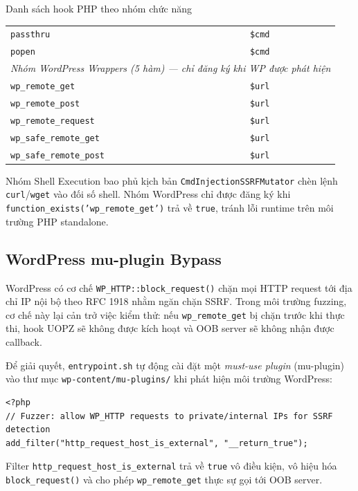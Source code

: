 \begin{table}[h]{Danh sách hook PHP theo nhóm chức năng}
\begin{tabular}{|l|l|p{4.2cm}|}
\texttt{passthru}             & \texttt{\$cmd}       & \\
\texttt{popen}                & \texttt{\$cmd}       & \\
\hline
\multicolumn{3}{|l|}{\textit{Nhóm WordPress Wrappers (5 hàm) — chỉ đăng ký khi WP được phát hiện}} \\
\hline
\texttt{wp\_remote\_get}       & \texttt{\$url}      & \\
\texttt{wp\_remote\_post}      & \texttt{\$url}      & \\
\texttt{wp\_remote\_request}   & \texttt{\$url}      & \\
\texttt{wp\_safe\_remote\_get} & \texttt{\$url}      & \\
\texttt{wp\_safe\_remote\_post}& \texttt{\$url}      & \\
\hline
\end{tabular}
\end{table}

Nhóm Shell Execution bao phủ kịch bản \texttt{CmdInjectionSSRFMutator}
chèn lệnh \texttt{curl}/\texttt{wget} vào đối số shell. Nhóm WordPress
chỉ được đăng ký khi \texttt{function\_exists('wp\_remote\_get')} trả về
\texttt{true}, tránh lỗi runtime trên môi trường PHP standalone.

\subsection{WordPress mu-plugin Bypass}

WordPress có cơ chế \texttt{WP\_HTTP::block\_request()} chặn mọi HTTP request
tới địa chỉ IP nội bộ theo RFC 1918 nhằm ngăn chặn SSRF. Trong môi trường
fuzzing, cơ chế này lại cản trở việc kiểm thử: nếu \texttt{wp\_remote\_get}
bị chặn trước khi thực thi, hook UOPZ sẽ không được kích hoạt và OOB server
sẽ không nhận được callback.

Để giải quyết, \texttt{entrypoint.sh} tự động cài đặt một
\textit{must-use plugin} (mu-plugin) vào thư mục
\texttt{wp-content/mu-plugins/} khi phát hiện môi trường WordPress:

\begin{verbatim}
<?php
// Fuzzer: allow WP_HTTP requests to private/internal IPs for SSRF detection
add_filter("http_request_host_is_external", "__return_true");
\end{verbatim}

Filter \texttt{http\_request\_host\_is\_external} trả về \texttt{true} vô
điều kiện, vô hiệu hóa \texttt{block\_request()} và cho phép
\texttt{wp\_remote\_get} thực sự gọi tới OOB server.

